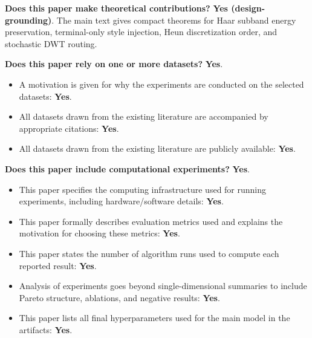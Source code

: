 \documentclass[letterpaper]{article}
\begin{document}
\noindent\textbf{Does this paper make theoretical contributions?} \textbf{Yes (design-grounding)}. The main text gives compact theorems for Haar subband energy preservation, terminal-only style injection, Heun discretization order, and stochastic DWT routing.

\noindent\textbf{Does this paper rely on one or more datasets?} \textbf{Yes}.
\begin{itemize}
\item A motivation is given for why the experiments are conducted on the selected datasets: \textbf{Yes}.
\item All datasets drawn from the existing literature are accompanied by appropriate citations: \textbf{Yes}.
\item All datasets drawn from the existing literature are publicly available: \textbf{Yes}.
\end{itemize}

\noindent\textbf{Does this paper include computational experiments?} \textbf{Yes}.
\begin{itemize}
\item This paper specifies the computing infrastructure used for running experiments, including hardware/software details: \textbf{Yes}.
\item This paper formally describes evaluation metrics used and explains the motivation for choosing these metrics: \textbf{Yes}.
\item This paper states the number of algorithm runs used to compute each reported result: \textbf{Yes}.
\item Analysis of experiments goes beyond single-dimensional summaries to include Pareto structure, ablations, and negative results: \textbf{Yes}.
\item This paper lists all final hyperparameters used for the main model in the artifacts: \textbf{Yes}.
\end{itemize}
\end{document}
